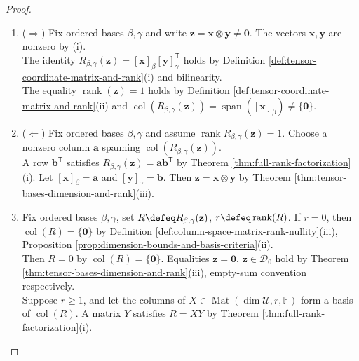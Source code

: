 \begin{theorem}
\begin{proof}
\begin{enumerate}[label=(\roman*)]
The bilinear map $(\mathbf{u},\mathbf{v})\mapsto\varphi_k(\mathbf{u})\mathbf{v}$ induces $T_k\in\LL(\mathcal{U}\otimes\mathcal{V},\mathcal{V})$ by Theorem \ref{thm:tensor-linearizes-bilinear-maps}(ii).\\
Then $\mathbf{0}=T_k(\sum\limits_{i=1}^{r}\mathbf{u}_i\otimes\mathbf{v}_i)=\sum\limits_{i=1}^{r}\delta_{ki}\mathbf{v}_i=\mathbf{v}_k$. The equality $\mathbf{v}_1=\cdots=\mathbf{v}_r=\mathbf{0}$ holds by the arbitrary choice of $k$.
\item[$(iii)$] ($\Rightarrow$) Fix ordered bases $\beta,\gamma$ and write $\mathbf{z}=\mathbf{x}\otimes\mathbf{y}\neq\mathbf{0}$. The vectors $\mathbf{x},\mathbf{y}$ are nonzero by (i).\\
The identity $R_{\beta,\gamma}(\mathbf{z})=[\mathbf{x}]_\beta[\mathbf{y}]_\gamma^{\mathsf{T}}$ holds by Definition \ref{def:tensor-coordinate-matrix-and-rank}(i) and bilinearity.\\
The equality $\operatorname{rank}(\mathbf{z})=1$ holds by Definition \ref{def:tensor-coordinate-matrix-and-rank}(ii) and $\operatorname{col}(R_{\beta,\gamma}(\mathbf{z}))=\operatorname{span}([\mathbf{x}]_\beta)\neq\{\mathbf{0}\}$.
\item[$(iii)$] ($\Leftarrow$) Fix ordered bases $\beta,\gamma$ and assume $\operatorname{rank}R_{\beta,\gamma}(\mathbf{z})=1$. Choose a nonzero column $\mathbf{a}$ spanning $\operatorname{col}(R_{\beta,\gamma}(\mathbf{z}))$.\\
A row $\mathbf{b}^{\mathsf{T}}$ satisfies $R_{\beta,\gamma}(\mathbf{z})=\mathbf{a}\mathbf{b}^{\mathsf{T}}$ by Theorem \ref{thm:full-rank-factorization}(i). Let $[\mathbf{x}]_\beta=\mathbf{a}$ and $[\mathbf{y}]_\gamma=\mathbf{b}$. Then $\mathbf{z}=\mathbf{x}\otimes\mathbf{y}$ by Theorem \ref{thm:tensor-bases-dimension-and-rank}(iii).
\item[$(iv)$] Fix ordered bases $\beta,\gamma$, set $R\defeq R_{\beta,\gamma}(\mathbf{z})$,  $r\defeq\operatorname{rank}(R)$. If $r=0$, then $\operatorname{col}(R)=\{\mathbf{0}\}$ by Definition \ref{def:column-space-matrix-rank-nullity}(iii), Proposition \ref{prop:dimension-bounds-and-basis-criteria}(ii).\\
Then $R=0$ by $\operatorname{col}(R)=\{\mathbf{0}\}$. Equalities $\mathbf{z}=\mathbf{0}$, $\mathbf{z}\in\mathcal{D}_0$ hold by Theorem \ref{thm:tensor-bases-dimension-and-rank}(iii), empty-sum convention respectively.\\
Suppose $r\geq1$, and let the columns of $X\in\operatorname{Mat}(\dim\mathcal{U},r,\mathbb{F})$ form a basis of $\operatorname{col}(R)$. A matrix $Y$ satisfies $R=XY$ by Theorem \ref{thm:full-rank-factorization}(i).\\

\end{enumerate}
\end{proof}
\end{theorem}
